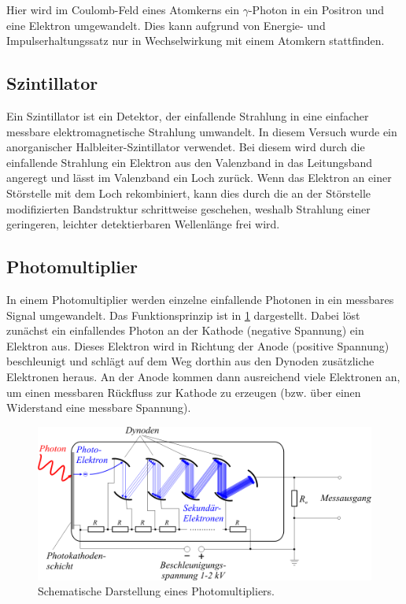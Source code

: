 \documentclass[
	a4paper,
	12pt,
	pagesize,
	ngerman
]{scrartcl}
\begin{document}
	Hier wird im Coulomb-Feld eines Atomkerns ein $\gamma$-Photon in ein Positron und eine Elektron umgewandelt.
	Dies kann aufgrund von Energie- und Impulserhaltungssatz nur in Wechselwirkung mit einem Atomkern stattfinden.

	\subsection{Szintillator}

	Ein Szintillator ist ein Detektor, der einfallende Strahlung in eine einfacher messbare elektromagnetische Strahlung umwandelt.
	In diesem Versuch wurde ein anorganischer Halbleiter-Szintillator verwendet.
	Bei diesem wird durch die einfallende Strahlung ein Elektron aus den Valenzband in das Leitungsband angeregt und lässt im Valenzband ein Loch zurück.
	Wenn das Elektron an einer Störstelle mit dem Loch rekombiniert, kann dies durch die an der Störstelle modifizierten Bandstruktur schrittweise geschehen, weshalb Strahlung einer geringeren, leichter detektierbaren Wellenlänge frei wird.

	\subsection{Photomultiplier}

	In einem Photomultiplier werden einzelne einfallende Photonen in ein messbares Signal umgewandelt.
	Das Funktionsprinzip ist in \cref{fig_Photomultiplier} dargestellt.
	Dabei löst zunächst ein einfallendes Photon an der Kathode (negative Spannung) ein Elektron aus.
	Dieses Elektron wird in Richtung der Anode (positive Spannung) beschleunigt und schlägt auf dem Weg dorthin aus den Dynoden zusätzliche Elektronen heraus.
	An der Anode kommen dann ausreichend viele Elektronen an, um einen messbaren Rückfluss zur Kathode zu erzeugen (bzw. über einen Widerstand eine messbare Spannung).

	\begin{figure}[H]
			\includegraphics[width=0.6\linewidth]{img/Photomultiplier}
			\caption{
			Schematische Darstellung eines Photomultipliers.
			\cite{Photomultiplier}
			}
			\label{fig_Photomultiplier}
	\end{figure}
\end{document}
